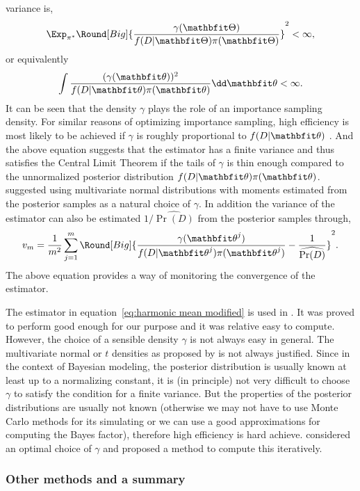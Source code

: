 variance is,
\begin{equation}
  \Exp_{\pi^*}\Round[Big]{
    \frac{\gamma(\bTh)}{f(D|\bTh)\pi(\bTh)}}^2 < \infty,
\end{equation}
or equivalently
\begin{equation}
  \int \frac{(\gamma(\bth))^2}{f(D|\bth)\pi(\bth)}\dd\bth < \infty.
\end{equation}
It can be seen that the density $\gamma$ plays the role of an importance
sampling density. For similar reasons of optimizing importance sampling, high
efficiency is most likely to be achieved if $\gamma$ is roughly proportional
to $f(D|\bth)$ \parencite{Kass1995}. And the above equation suggests that the
estimator has a finite variance and thus satisfies the Central Limit Theorem
if the tails of $\gamma$ is thin enough compared to the unnormalized posterior
distribution $f(D|\bth)\pi(\bth)$. \textcite{Gelfand1994} suggested using
multivariate normal distributions with moments estimated from the posterior
samples as a natural choice of $\gamma$. In addition the variance of the
estimator can also be estimated $1/\widehat{\Pr(D)}$ from the posterior
samples through,
\begin{equation}
  v_m = \frac{1}{m^2}\sum_{j=1}^m \Round[Big]{
    \frac{\gamma(\bth^j)}{f(D|\bth^j)\pi(\bth^j)}
    - \frac{1}{\widehat{\Pr(D)}}}^2.
\end{equation}
The above equation provides a way of monitoring the convergence of the
estimator.

The estimator in equation~\eqref{eq:harmonic mean modified} is used in
\textcite{Zhou2011}. It was proved to perform good enough for our purpose and
it was relative easy to compute. However, the choice of a sensible density
$\gamma$ is not always easy in general. The multivariate normal or $t$
densities as proposed by \textcite{Gelfand1994} is not always justified. Since
in the context of Bayesian modeling, the posterior distribution is usually
known at least up to a normalizing constant, it is (in principle) not very
difficult to choose $\gamma$ to satisfy the condition for a finite variance.
But the properties of the posterior distributions are usually not known
(otherwise we may not have to use Monte Carlo methods for its simulating or we
can use a good approximations for computing the Bayes factor), therefore high
efficiency is hard achieve. \textcite{Meng1996} considered an optimal choice
of $\gamma$ and proposed a method to compute this iteratively.

\subsubsection{Other methods and a summary}
\label{ssub:Other methods and a summary a}

